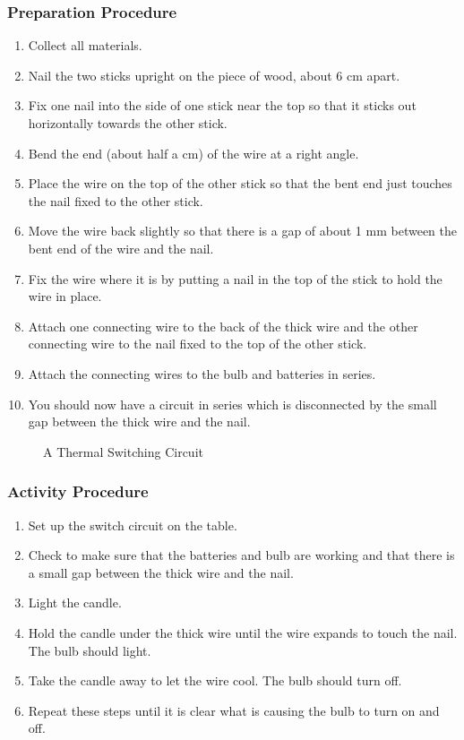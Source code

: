 \subsubsection*{Preparation Procedure}
\begin{enumerate}
\item{Collect all materials.} 
\item{Nail the two sticks upright on the piece of wood, about 6 cm apart.} 
\item{Fix one nail into the side of one stick near the top so that it sticks out horizontally towards the other stick.} 
\item{Bend the end (about half a cm) of the wire at a right angle.} 
\item{Place the wire on the top of the other stick so that the bent end just touches the nail fixed to the other stick.} 
\item{Move the wire back slightly so that there is a gap of about 1 mm between the bent end of the wire and the nail.} 
\item{Fix the wire where it is by putting a nail in the top of the stick to hold the wire in place.} 
\item{Attach one connecting wire to the back of the thick wire and the other connecting wire to the nail fixed to the top of the other stick.} 
\item{Attach the connecting wires to the bulb and batteries in series.} 
\item{You should now have a circuit in series which is disconnected by the small gap between the thick wire and the nail.} 
\end{enumerate}

\begin{figure}
\begin{center}
\def\svgwidth{150pt}

\caption{A Thermal Switching Circuit}
\label{fig:thermal-switch}
\end{center}
\end{figure}

\subsubsection*{Activity Procedure}
\begin{enumerate}
\item{Set up the switch circuit on the table.} 
\item{Check to make sure that the batteries and bulb are working and that there is a small gap between the thick wire and the nail.} 
\item{Light the candle.} 
\item{Hold the candle under the thick wire until the wire expands to touch the nail. The bulb should light.} 
\item{Take the candle away to let the wire cool. The bulb should turn off.} 
\item{Repeat these steps until it is clear what is causing the bulb to turn on and off.} 
\end{enumerate}

